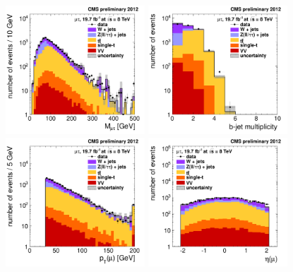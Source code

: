 \documentclass[12pt]{thesis}  %
\begin{document}
\begin{figure}[hbtp]
  \begin{center}
    \includegraphics[width=0.465\textwidth]{figures/mutau/preselection/mass.pdf}
    \includegraphics[width=0.465\textwidth]{figures/mutau/preselection/nbjet.pdf} \\
    \includegraphics[width=0.465\textwidth]{figures/mutau/preselection/ptmu.pdf}
    \includegraphics[width=0.465\textwidth]{figures/mutau/preselection/etamu.pdf} \\

\end{center}
\end{figure}
\end{document}
